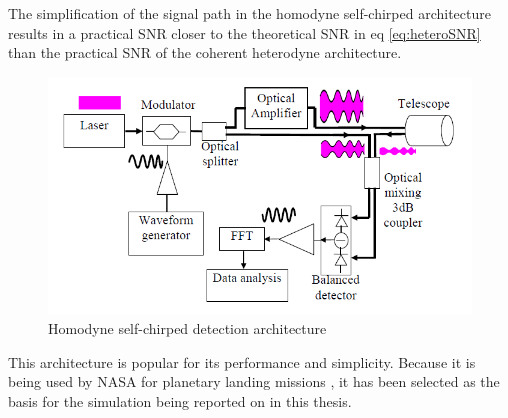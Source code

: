 The simplification of the signal path in the homodyne self-chirped architecture results in a practical SNR closer
to the theoretical SNR in eq \ref{eq:heteroSNR} than the practical SNR of the coherent heterodyne architecture. 

\begin{figure}[H]
	\centering
	\includegraphics[width=0.8\columnwidth]{figs/simpleHomodyne}
	\vspace{1em}
	\caption{Homodyne self-chirped detection architecture}
	\label{fig:homodyneBlock}
\end{figure}

This architecture is popular for its performance and simplicity. Because it is being used by NASA for planetary 
landing missions \cite{amz12,amz12fiber,amz12p2,amz16coherent,pierrottet2009flight,pierrottet2011navigation}, it
has been selected as the basis for the simulation being reported on in this thesis. 



